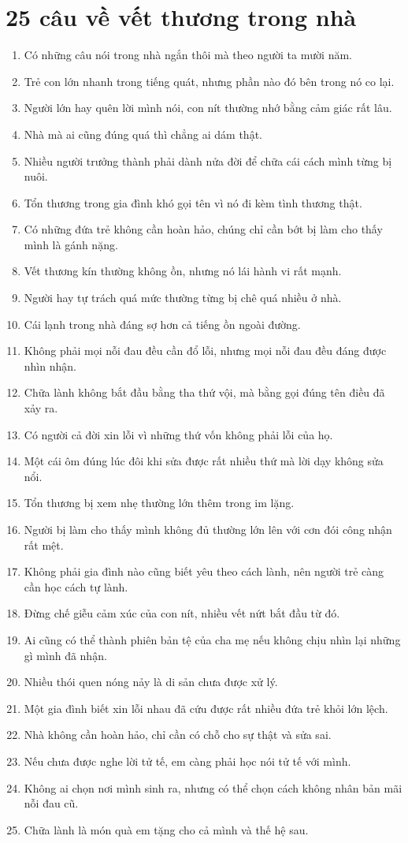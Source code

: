\section{25 câu về vết thương trong nhà}
\begin{enumerate}[leftmargin=*,resume]
\item Có những câu nói trong nhà ngắn thôi mà theo người ta mười năm.
\item Trẻ con lớn nhanh trong tiếng quát, nhưng phần nào đó bên trong nó co lại.
\item Người lớn hay quên lời mình nói, con nít thường nhớ bằng cảm giác rất lâu.
\item Nhà mà ai cũng đúng quá thì chẳng ai dám thật.
\item Nhiều người trưởng thành phải dành nửa đời để chữa cái cách mình từng bị nuôi.
\item Tổn thương trong gia đình khó gọi tên vì nó đi kèm tình thương thật.
\item Có những đứa trẻ không cần hoàn hảo, chúng chỉ cần bớt bị làm cho thấy mình là gánh nặng.
\item Vết thương kín thường không ồn, nhưng nó lái hành vi rất mạnh.
\item Người hay tự trách quá mức thường từng bị chê quá nhiều ở nhà.
\item Cái lạnh trong nhà đáng sợ hơn cả tiếng ồn ngoài đường.
\item Không phải mọi nỗi đau đều cần đổ lỗi, nhưng mọi nỗi đau đều đáng được nhìn nhận.
\item Chữa lành không bắt đầu bằng tha thứ vội, mà bằng gọi đúng tên điều đã xảy ra.
\item Có người cả đời xin lỗi vì những thứ vốn không phải lỗi của họ.
\item Một cái ôm đúng lúc đôi khi sửa được rất nhiều thứ mà lời dạy không sửa nổi.
\item Tổn thương bị xem nhẹ thường lớn thêm trong im lặng.
\item Người bị làm cho thấy mình không đủ thường lớn lên với cơn đói công nhận rất mệt.
\item Không phải gia đình nào cũng biết yêu theo cách lành, nên người trẻ càng cần học cách tự lành.
\item Đừng chế giễu cảm xúc của con nít, nhiều vết nứt bắt đầu từ đó.
\item Ai cũng có thể thành phiên bản tệ của cha mẹ nếu không chịu nhìn lại những gì mình đã nhận.
\item Nhiều thói quen nóng nảy là di sản chưa được xử lý.
\item Một gia đình biết xin lỗi nhau đã cứu được rất nhiều đứa trẻ khỏi lớn lệch.
\item Nhà không cần hoàn hảo, chỉ cần có chỗ cho sự thật và sửa sai.
\item Nếu chưa được nghe lời tử tế, em càng phải học nói tử tế với mình.
\item Không ai chọn nơi mình sinh ra, nhưng có thể chọn cách không nhân bản mãi nỗi đau cũ.
\item Chữa lành là món quà em tặng cho cả mình và thế hệ sau.
\end{enumerate}

